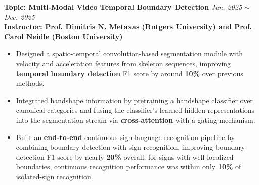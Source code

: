 \documentclass{article}
\begin{document}
\vspace{-10pt}
\noindent \textbf{Topic: Multi-Modal Video Temporal Boundary Detection} \hfill \emph{Jan. 2025 $\sim$ Dec. 2025}\\
\textbf{Instructor: Prof. \href{https://people.cs.rutgers.edu/~dnm/}{\color{blue}Dimitris N. Metaxas} (Rutgers University) and Prof. \href{https://www.bu.edu/asllrp/carol.html}{\color{blue}Carol Neidle} (Boston University)}
\begin{itemize}[noitemsep,nolistsep,leftmargin=*]
\item Designed a spatio-temporal convolution-based segmentation module with velocity and acceleration features from skeleton sequences, improving \textbf{temporal boundary detection} F1 score by around \textbf{10\%} over previous methods.
\item Integrated handshape information by pretraining a handshape classifier over canonical categories and fusing the classifier's learned hidden representations into the segmentation stream via \textbf{cross-attention} with a gating mechanism.
\item Built an \textbf{end-to-end} continuous sign language recognition pipeline by combining boundary detection with sign recognition, improving boundary detection F1 score by nearly \textbf{20\%} overall; for signs with well-localized boundaries, continuous recognition performance was within only \textbf{10\%} of isolated-sign recognition.\\
\end{itemize}
\end{document}
